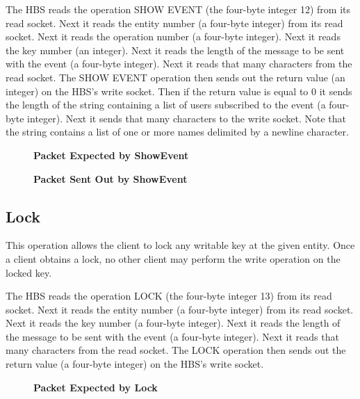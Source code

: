 The HBS reads the operation SHOW EVENT (the four-byte integer 12) from its
read socket.  Next it reads the entity number (a four-byte integer) from
its read socket.  Next it reads the operation number (a four-byte integer).
Next it reads the key number (an integer).  Next it reads the length
of the message to be sent with the event (a four-byte integer).  Next it
reads that many characters from the read socket.  The SHOW EVENT
operation then sends out the return value (an integer) on the HBS's write
socket.  Then if the return value is equal to 0 it sends the length of the
string containing a list of users subscribed to the event (a four-byte
integer).  Next it sends that many characters to the write socket.  Note
that the string contains a list of one or more names delimited by a newline
character.

\begin{figure}[htb]
  \centerline{}
  \caption{{\bf Packet Expected by ShowEvent}}
  \label{fig:ShowEvent1}
\end{figure}

\begin{figure}[htb]
  \centerline{}
  \caption{{\bf Packet Sent Out by ShowEvent}}
  \label{fig:ShowEvent2}
\end{figure}


\newpage
\subsection{Lock}

This operation allows the client to lock any writable key at the given
entity.  Once a client obtains a lock, no other client may perform the
write operation on the locked key.  

The HBS reads the operation LOCK (the four-byte integer 13) from its read
socket.  Next it reads the entity number (a four-byte integer) from its
read socket.  Next it reads the key number (a four-byte integer).  
Next it reads the length of the message to be sent with the event (a
four-byte integer).  Next it reads that many characters from the read
socket.  The LOCK operation then sends out the return value (a four-byte
integer) on the HBS's write socket.

\begin{figure}[htb]
  \centerline{}
  \caption{{\bf Packet Expected by Lock}}
  \label{fig:Lock1}
\end{figure}

